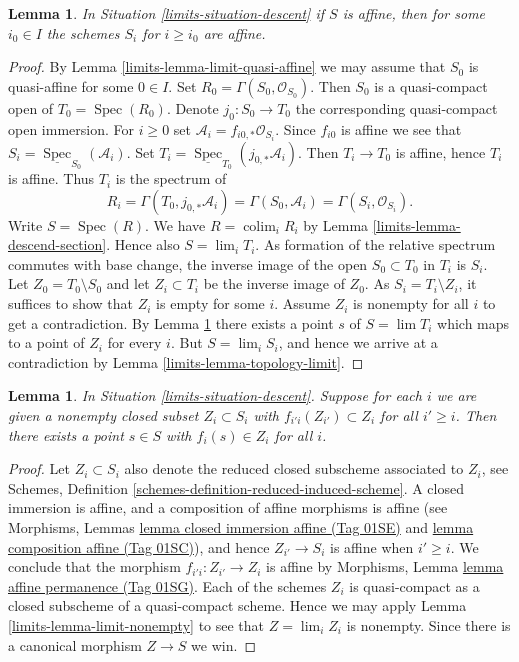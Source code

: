 \documentclass{amsart}
\theoremstyle{plain}
\newtheorem{lemma}[subsection]{Lemma}
\theoremstyle{definition}
\theoremstyle{remark}
\numberwithin{equation}{subsection}
\def\lim{\mathop{\mathrm{lim}}\nolimits}
\def\colim{\mathop{\mathrm{colim}}\nolimits}
\def\Spec{\mathop{\mathrm{Spec}}}
\begin{document}
\begin{lemma}
\label{limits-lemma-limit-affine}
In Situation \ref{limits-situation-descent} if $S$ is affine,
then for some $i_0 \in I$ the schemes $S_i$ for $i \geq i_0$
are affine.
\end{lemma}

\begin{proof}
By Lemma \ref{limits-lemma-limit-quasi-affine} we may assume that $S_0$ is
quasi-affine for some $0 \in I$. Set $R_0 = \Gamma(S_0, \mathcal{O}_{S_0})$.
Then $S_0$ is a quasi-compact open of $T_0 = \Spec(R_0)$. Denote
$j_0 : S_0 \to T_0$ the corresponding quasi-compact open immersion.
For $i \geq 0$ set $\mathcal{A}_i = f_{i0, *}\mathcal{O}_{S_i}$.
Since $f_{i0}$ is affine we see that
$S_i = \underline{\Spec}_{S_0}(\mathcal{A}_i)$.
Set $T_i = \underline{\Spec}_{T_0}(j_{0, *}\mathcal{A}_i)$.
Then $T_i \to T_0$ is affine, hence $T_i$ is affine. Thus
$T_i$ is the spectrum of
$$
R_i = \Gamma(T_0, j_{0, *}\mathcal{A}_i) = \Gamma(S_0, \mathcal{A}_i) =
\Gamma(S_i, \mathcal{O}_{S_i}).
$$
Write $S = \Spec(R)$. We have $R = \colim_i R_i$
by Lemma \ref{limits-lemma-descend-section}.
Hence also $S = \lim_i T_i$. As formation of the relative spectrum commutes
with base change, the inverse image
of the open $S_0 \subset T_0$ in $T_i$ is $S_i$.
Let $Z_0 = T_0 \setminus S_0$ and let $Z_i \subset T_i$
be the inverse image of $Z_0$. As $S_i = T_i \setminus Z_i$, it suffices
to show that $Z_i$ is empty for some $i$. Assume $Z_i$ is nonempty for all
$i$ to get a contradiction. By Lemma \ref{limits-lemma-limit-closed-nonempty}
there exists a point $s$ of $S = \lim T_i$ which maps to a point of $Z_i$
for every $i$. But $S = \lim_i S_i$, and hence we arrive at a contradiction
by Lemma \ref{limits-lemma-topology-limit}.
\end{proof}


\begin{lemma}
\label{limits-lemma-limit-closed-nonempty}
In Situation \ref{limits-situation-descent}.
Suppose for each $i$ we are given a nonempty closed subset
$Z_i \subset S_i$ with $f_{i'i}(Z_{i'}) \subset Z_i$ for all
$i' \geq i$.
Then there exists a point $s \in S$ with $f_i(s) \in Z_i$ for
all $i$.
\end{lemma}

\begin{proof}
Let $Z_i \subset S_i$ also denote the reduced closed subscheme
associated to $Z_i$, see Schemes,
Definition \ref{schemes-definition-reduced-induced-scheme}.
A closed immersion is affine, and a composition of affine
morphisms is affine (see
Morphisms, Lemmas \href{https://stacks.math.columbia.edu/tag/01SE}{lemma closed immersion affine (Tag 01SE)}
and \href{https://stacks.math.columbia.edu/tag/01SC}{lemma composition affine (Tag 01SC)}), and hence $Z_{i'} \to S_i$ is
affine when $i' \geq i$. We conclude that the morphism
$f_{i'i} : Z_{i'} \to Z_i$ is affine by
Morphisms, Lemma \href{https://stacks.math.columbia.edu/tag/01SG}{lemma affine permanence (Tag 01SG)}.
Each of the schemes $Z_i$ is quasi-compact as a closed
subscheme of a quasi-compact scheme. Hence we may apply
Lemma \ref{limits-lemma-limit-nonempty} to see that
$Z = \lim_i Z_i$ is nonempty. Since there is a
canonical morphism $Z \to S$ we win.
\end{proof}
\end{document}
